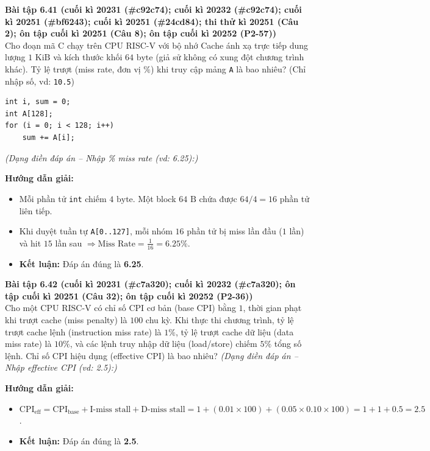 \textbf{Bài tập 6.41 (cuối kì 20231 (\#c92c74); cuối kì 20232 (\#c92c74); cuối kì 20251 (\#bf6243); cuối kì 20251 (\#24cd84); thi thử kì 20251 (Câu 2); ôn tập cuối kì 20251 (Câu 8); ôn tập cuối kì 20252 (P2-57))}\\
Cho đoạn mã C chạy trên CPU RISC-V với bộ nhớ Cache ánh xạ trực tiếp dung lượng $1\text{ KiB}$ và kích thước khối $64\text{ byte}$ (giả sử không có xung đột chương trình khác). Tỷ lệ trượt (miss rate, đơn vị $\%$) khi truy cập mảng \texttt{A} là bao nhiêu? (Chỉ nhập số, vd: \texttt{10.5})
\begin{lstlisting}
int i, sum = 0;
int A[128];
for (i = 0; i < 128; i++)
    sum += A[i];
\end{lstlisting}
\textit{(Dạng điền đáp án -- Nhập \% miss rate (vd: 6.25):)}\par
\textbf{Hướng dẫn giải:}
\begin{itemize}
    \item Mỗi phần tử \texttt{int} chiếm $4\text{ byte}$. Một block $64\text{ B}$ chứa được $64 / 4 = 16$ phần tử liên tiếp.
    \item Khi duyệt tuần tự \texttt{A[0..127]}, mỗi nhóm $16$ phần tử bị miss lần đầu ($1$ lần) và hit $15$ lần sau $\Rightarrow \text{Miss Rate} = \frac{1}{16} = \mathbf{6.25\%}$.
    \item \textbf{Kết luận:} Đáp án đúng là \textbf{6.25}.
\end{itemize}

\textbf{Bài tập 6.42 (cuối kì 20231 (\#c7a320); cuối kì 20232 (\#c7a320); ôn tập cuối kì 20251 (Câu 32); ôn tập cuối kì 20252 (P2-36))}\\
Cho một CPU RISC-V có chỉ số CPI cơ bản (base CPI) bằng $1$, thời gian phạt khi trượt cache (miss penalty) là $100$ chu kỳ. Khi thực thi chương trình, tỷ lệ trượt cache lệnh (instruction miss rate) là $1\%$, tỷ lệ trượt cache dữ liệu (data miss rate) là $10\%$, và các lệnh truy nhập dữ liệu (load/store) chiếm $5\%$ tổng số lệnh. Chỉ số CPI hiệu dụng (effective CPI) là bao nhiêu?
\textit{(Dạng điền đáp án -- Nhập effective CPI (vd: 2.5):)}\par
\textbf{Hướng dẫn giải:}
\begin{itemize}
    \item $\text{CPI}_{\text{eff}} = \text{CPI}_{\text{base}} + \text{I-miss stall} + \text{D-miss stall} = 1 + (0.01 \times 100) + (0.05 \times 0.10 \times 100) = 1 + 1 + 0.5 = \mathbf{2.5}$.
    \item \textbf{Kết luận:} Đáp án đúng là \textbf{2.5}.
\end{itemize}

